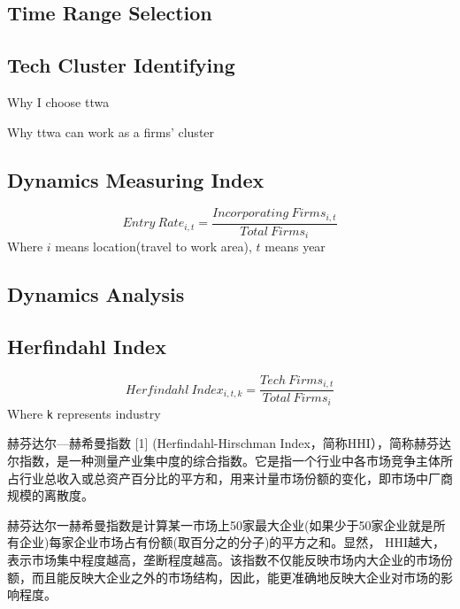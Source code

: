 \documentclass[
  12pt,
  oneside]{book}
\begin{document}
\hypertarget{time-range-selection}{%
\subsection{Time Range Selection}\label{time-range-selection}}

\hypertarget{tech-cluster-identifying}{%
\subsection{Tech Cluster Identifying}\label{tech-cluster-identifying}}

Why I choose ttwa

Why ttwa can work as a firms' cluster

\hypertarget{dynamics-measuring-index}{%
\subsection{Dynamics Measuring Index}\label{dynamics-measuring-index}}

\[ Entry\ Rate_{i,t} = \frac{Incorporating\ Firms_{i,t}}{Total\  Firms_{i}} \]
Where \(i\) means location(travel to work area), \(t\) means year

\hypertarget{dynamics-analysis}{%
\subsection{Dynamics Analysis}\label{dynamics-analysis}}

\hypertarget{herfindahl-index}{%
\subsection{Herfindahl Index}\label{herfindahl-index}}

\[ Herfindahl\ Index_{i,t,k} = \frac{Tech\ Firms_{i,t}}{Total\  Firms_{i}} \]
Where \texttt{k} represents industry

赫芬达尔---赫希曼指数 {[}1{]} (Herfindahl-Hirschman Index，简称HHI），简称赫芬达尔指数，是一种测量产业集中度的综合指数。它是指一个行业中各市场竞争主体所占行业总收入或总资产百分比的平方和，用来计量市场份额的变化，即市场中厂商规模的离散度。

赫芬达尔一赫希曼指数是计算某一市场上50家最大企业(如果少于50家企业就是所有企业)每家企业市场占有份额(取百分之的分子)的平方之和。显然， HHI越大，表示市场集中程度越高，垄断程度越高。该指数不仅能反映市场内大企业的市场份额，而且能反映大企业之外的市场结构，因此，能更准确地反映大企业对市场的影响程度。
\end{document}
